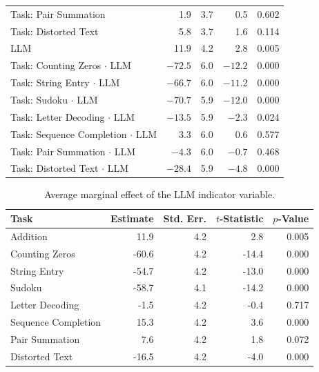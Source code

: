 \documentclass[12pt,a4paper]{article}
\begin{document}
\begin{table}[ht]
\begin{tabular}{lrrrc}
Task: Pair Summation & 1.9 & 3.7 & 0.5 & 0.602 \\
Task: Distorted Text & 5.8 & 3.7 & 1.6 & 0.114 \\
LLM & 11.9 & 4.2 & 2.8 & 0.005 \\
Task: Counting Zeros $\cdot$ LLM & $-72.5$ & 6.0 & $-12.2$ & 0.000 \\
Task: String Entry $\cdot$ LLM & $-66.7$ & 6.0 & $-11.2$ & 0.000 \\
Task: Sudoku $\cdot$ LLM & $-70.7$ & 5.9 & $-12.0$ & 0.000 \\
Task: Letter Decoding $\cdot$ LLM & $-13.5$ & 5.9 & $-2.3$ & 0.024 \\
Task: Sequence Completion $\cdot$ LLM & 3.3 & 6.0 & 0.6 & 0.577 \\
Task: Pair Summation $\cdot$ LLM & $-4.3$ & 6.0 & $-0.7$ & 0.468 \\
Task: Distorted Text $\cdot$ LLM & $-28.4$ & 5.9 & $-4.8$ & 0.000 \\
\bottomrule
\end{tabular}
\end{table}

\begin{table}[ht]
\centering\footnotesize
\renewcommand{\arraystretch}{1.4}
\begin{tabular}{lrrrr}
  \toprule
\textbf{Task} & \textbf{Estimate} & \textbf{Std. Err.} & \textbf{$t$-Statistic} & \textbf{$p$-Value} \\ 
  \midrule
  Addition & 11.9 & 4.2 & 2.8 & 0.005 \\ 
  Counting Zeros & -60.6 & 4.2 & -14.4 & 0.000 \\ 
  String Entry & -54.7 & 4.2 & -13.0 & 0.000 \\ 
  Sudoku & -58.7 & 4.1 & -14.2 & 0.000 \\ 
  Letter Decoding & -1.5 & 4.2 & -0.4 & 0.717 \\ 
  Sequence Completion & 15.3 & 4.2 & 3.6 & 0.000 \\ 
  Pair Summation & 7.6 & 4.2 & 1.8 & 0.072 \\ 
  Distorted Text & -16.5 & 4.2 & -4.0 & 0.000 \\ 
   \bottomrule
\end{tabular}
\caption{Average marginal effect of the LLM indicator variable.} 
\label{tab:avg_llm_hum}
\end{table}
\end{document}
